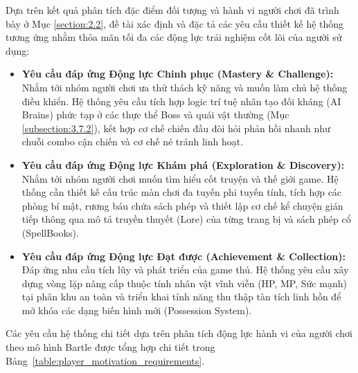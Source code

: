 \documentclass[../DoAn.tex]{subfiles}
\begin{document}
Dựa trên kết quả phân tích đặc điểm đối tượng và hành vi người chơi đã trình bày ở Mục \ref{section:2.2}, đề tài xác định và đặc tả các yêu cầu thiết kế hệ thống tương ứng nhằm thỏa mãn tối đa các động lực trải nghiệm cốt lõi của người sử dụng:

\begin{itemize}
    \item \textbf{Yêu cầu đáp ứng Động lực Chinh phục (Mastery \& Challenge):}
    Nhắm tới nhóm người chơi ưa thử thách kỹ năng và muốn làm chủ hệ thống điều khiển. Hệ thống yêu cầu tích hợp logic trí tuệ nhân tạo đối kháng (AI Brains) phức tạp ở các thực thể Boss và quái vật thường (Mục \ref{subsection:3.7.2}), kết hợp cơ chế chiến đấu đòi hỏi phản hồi nhanh như chuỗi combo cận chiến và cơ chế né tránh linh hoạt.
    
    \item \textbf{Yêu cầu đáp ứng Động lực Khám phá (Exploration \& Discovery):}
    Nhắm tới nhóm người chơi muốn tìm hiểu cốt truyện và thế giới game. Hệ thống cần thiết kế cấu trúc màn chơi đa tuyến phi tuyến tính, tích hợp các phòng bí mật, rương báu chứa sách phép và thiết lập cơ chế kể chuyện gián tiếp thông qua mô tả truyền thuyết (Lore) của từng trang bị và sách phép cổ (SpellBooks).
    
    \item \textbf{Yêu cầu đáp ứng Động lực Đạt được (Achievement \& Collection):}
    Đáp ứng nhu cầu tích lũy và phát triển của game thủ. Hệ thống yêu cầu xây dựng vòng lặp nâng cấp thuộc tính nhân vật vĩnh viễn (HP, MP, Sức mạnh) tại phân khu an toàn và triển khai tính năng thu thập tàn tích linh hồn để mở khóa các dạng biến hình mới (Possession System).
\end{itemize}

Các yêu cầu hệ thống chi tiết dựa trên phân tích động lực hành vi của người chơi theo mô hình Bartle được tổng hợp chi tiết trong Bảng~\ref{table:player_motivation_requirements}.
\end{document}
